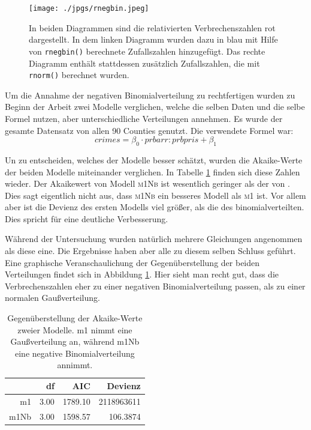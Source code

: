\begin{figure}
\centering
\texttt{[image: ./jpgs/rnegbin.jpeg]}
\caption[Verbechenszahlen Vergleich]{In beiden Diagrammen sind die relativierten Verbrechenszahlen rot dargestellt.
		 In dem linken Diagramm wurden dazu in blau mit Hilfe von \texttt{rnegbin()} berechnete     Zufallszahlen hinzugef\"ugt.
		 Das rechte Diagramm enth\"alt stattdessen zus\"atzlich Zufallszahlen, die mit \texttt{rnorm()} berechnet wurden.}
\label{fig:nbd}
\end{figure}
\par\smallskip

Um die Annahme der negativen Binomialverteilung zu rechtfertigen wurden zu Beginn der Arbeit zwei Modelle verglichen, welche die selben Daten und die selbe Formel nutzen, aber unterschiedliche Verteilungen annehmen.
Es wurde der gesamte Datensatz von allen 90 Counties genutzt.
Die verwendete Formel war:
\begin{equation}
crimes = \beta_0 \cdot prbarr:prbpris + \beta_1
\end{equation}

Un zu entscheiden, welches der Modelle besser sch\"atzt, wurden die Akaike-Werte der beiden Modelle miteinander verglichen.
In Tabelle \ref{tab:agn} finden sich diese Zahlen wieder.
Der Akaikewert von Modell \textsc{m1Nb} ist wesentlich geringer als der von .
Dies sagt eigentlich nicht aus, dass \textsc{m1Nb} ein besseres Modell als \textsc{m1} ist.
Vor allem aber ist die Devienz des ersten Modells viel gr\"o\ss{}er, als die des binomialverteilten.
Dies spricht f\"ur eine deutliche Verbesserung.
\par\smallskip
W\"ahrend der Untersuchung wurden nat\"urlich mehrere Gleichungen angenommen als diese eine.
Die Ergebnisse haben aber alle zu diesem selben Schluss gef\"uhrt.
Eine graphische Veranschaulichung der Gegen\"uberstellung der beiden Verteilungen findet sich in Abbildung \ref{fig:nbd}.
Hier sieht man recht gut, dass die Verbrechenszahlen eher zu einer negativen Binomialverteilung passen, als zu einer normalen Gau\ss{}verteilung.
  
\begin{table}[ht]
\centering
\begin{tabular}{rrrr}
  \hline
 	   & df & AIC & Devienz\\ 
  \hline
	m1 & 3.00 & 1789.10 & 2118963611\\ 
  m1Nb & 3.00 & 1598.57 & 106.3874\\ 
   \hline
\end{tabular}
\caption[Welche Verteilung?]{Gegen\"uberstellung der Akaike-Werte zweier Modelle. m1 nimmt eine Gau\ss{}verteilung an, w\"ahrend m1Nb eine negative Binomialverteilung annimmt.}
\label{tab:agn}
\end{table}


